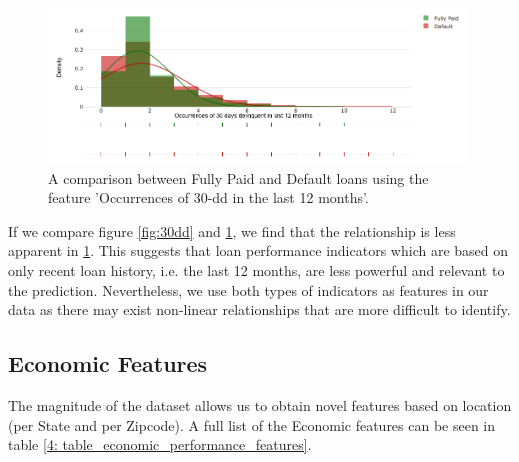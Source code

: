             \begin{figure}[H]
                \centering
                \includegraphics[width=0.99\textwidth]{Images/occur_30_dd_12_mon_dist.png}
                \caption{A comparison between Fully Paid and Default loans using the feature 'Occurrences of 30-dd in the last 12 months'.}
                \label{fig:30dd_12months}
            \end{figure}
            
            If we compare figure \ref{fig:30dd} and \ref{fig:30dd_12months}, we find that the relationship is less apparent in \ref{fig:30dd_12months}. This suggests that loan performance indicators which are based on only recent loan history, i.e. the last 12 months, are less powerful and relevant to the prediction. Nevertheless, we use both types of indicators as features in our data as there may exist non-linear relationships that are more difficult to identify. 
            


        
        
        \subsection{Economic Features} \label{economic_update_features}
            The magnitude of the dataset allows us to obtain novel features based on location (per State and per Zipcode). A full list of the Economic features can be seen in table \ref{4: table_economic_performance_features}.
            
